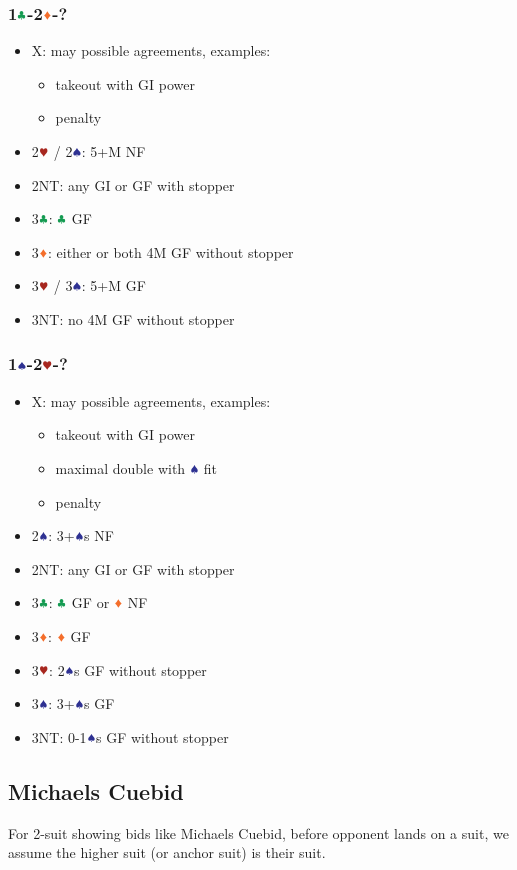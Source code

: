 \documentclass{article}
\begin{document}
\begin{multicols}{2}
\subsubsection{1$\ccc$-2$\ddd$-?}
\begin{itemize}
    \item X: may possible agreements, examples:
    \begin{itemize}
        \item takeout with GI power
        \item penalty
    \end{itemize}
    \item 2$\hhh$ / 2$\sss$: 5+M NF
    \item 2NT: any GI or GF with stopper
    \item 3$\ccc$: $\ccc$ GF
    \item 3$\ddd$: either or both 4M GF without stopper
    \item 3$\hhh$ / 3$\sss$: 5+M GF
    \item 3NT: no 4M GF without stopper
\end{itemize}

\subsubsection{1$\sss$-2$\hhh$-?}
\begin{itemize}
    \item X: may possible agreements, examples:
    \begin{itemize}
        \item takeout with GI power
        \item maximal double with $\sss$ fit
        \item penalty
    \end{itemize}
    \item 2$\sss$: 3+$\sss$s NF
    \item 2NT: any GI or GF with stopper
    \item 3$\ccc$: $\ccc$ GF or $\ddd$ NF
    \item 3$\ddd$: $\ddd$ GF
    \item 3$\hhh$: 2$\sss$s GF without stopper
    \item 3$\sss$: 3+$\sss$s GF
    \item 3NT: 0-1$\sss$s GF without stopper
\end{itemize}

\subsection{Michaels Cuebid}
For 2-suit showing bids like Michaels Cuebid, before opponent lands on a suit, we assume the higher suit (or anchor suit) is their suit.

\end{multicols}
\end{document}
